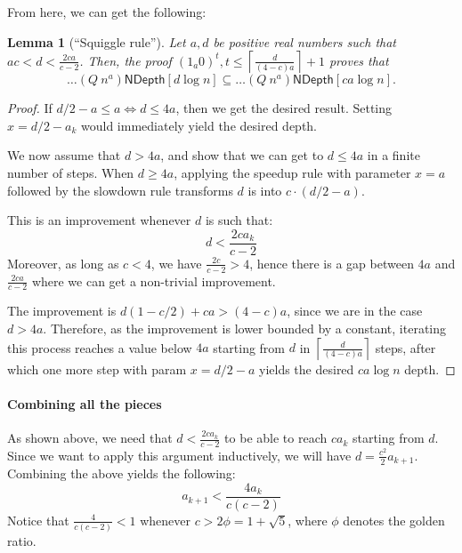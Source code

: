 \documentclass[a4paper, 11pt]{article}
\theoremstyle{plain}
\newtheorem{lemma}[theorem]{Lemma}
\theoremstyle{definition}
\theoremstyle{remark}
\newcommand{\ND}{\textsf{NDepth}}%
\newcommand{\NDL}[1]{\ND\left[ #1 \log n\right]}%
\begin{document}
From here, we can get the following:
\begin{lemma}[``Squiggle rule'']\label{lemma:squiggle}
	Let $a,d$ be positive real numbers such that $ac < d < \frac{2ca}{c-2}$.
	Then, the proof $(1_{a}0)^t, t \le \left\lceil\frac{d}{(4-c)a}\right\rceil + 1$
	proves that
	\[\ldots (Q~n^a)\NDL{d} \subseteq \ldots (Q~n^a)\NDL{ca}.\]
\end{lemma}
\begin{proof}
	If $d/2 - a \le a \Leftrightarrow d \le 4a$,
	then we get the desired result.
	Setting $x = d/2 - a_k$ would immediately yield the desired depth.

	We now assume that $d > 4a$, and show that we can get to $d \le 4a$ in a finite number of steps.
	When $d \ge 4a$, applying the speedup rule with parameter $x = a$
	followed by the slowdown rule transforms
	$d$ is into $c\cdot(d/2 - a)$.

	This is an improvement whenever $d$ is such that:
	\begin{equation}
		d < \frac{2ca_k}{c-2} \label{eq:cstr3}
	\end{equation}
	Moreover, as long as $c < 4$, we have $\frac{2c}{c-2} > 4$, hence 
	there is a gap between $4a$ and $\frac{2ca}{c-2}$ where we can get a non-trivial improvement.

	The improvement is $d(1 - c/2) + ca > (4-c)a$, since we are in the case $d > 4a$.
	Therefore, as the improvement is lower bounded by a constant,
	iterating this process reaches a value below $4a$ 
	starting from $d$ in $\left\lceil\frac{d}{(4-c)a}\right\rceil$ steps,
	after which one more step with param $x = d/2 - a$
	yields the desired $ca \log n$ depth.
\end{proof}

\paragraph{Combining all the pieces}
As shown above, we need that $d < \frac{2ca_k}{c-2}$ 
to be able to reach $ca_k$ starting from $d$.
Since we want to apply this argument inductively, we will have 
$d = \frac{c^2}{2}a_{k+1}$.
Combining the above yields the following:
\begin{equation}
	a_{k+1} < \frac{4a_k}{c(c-2)} \label{eq:cstr_ak}
\end{equation}
Notice that $\frac{4}{c(c-2)} < 1$ whenever $c > 2\phi = 1 + \sqrt{5}$, 
where $\phi$ denotes the golden ratio.
\end{document}
